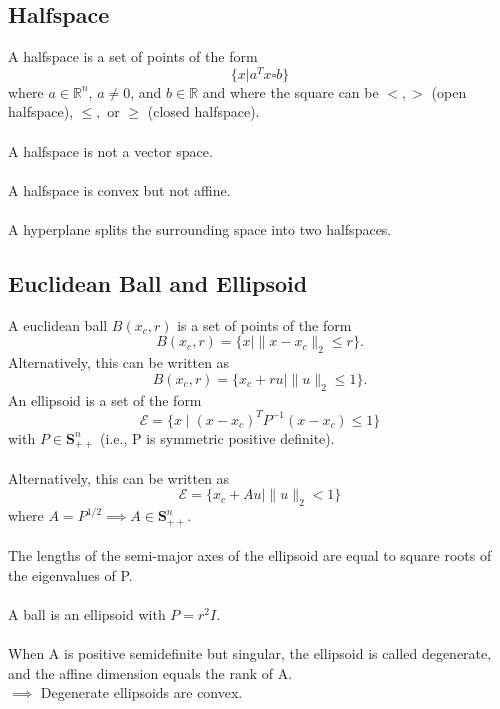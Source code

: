 \documentclass[]{article}
\begin{document}
\subsection*{Halfspace}
A halfspace is a set of points of the form $$\{x|a^{T} x \square b \}$$
where $a \in \mathbb{R}^{n}$, $a \neq 0$, and $b \in \mathbb{R}$ and where the square can be $<, >$ (open halfspace), $\leq,$ or $\geq$ (closed halfspace). \\\\
A halfspace is not a vector space. \\\\
A halfspace is convex but not affine. \\\\
A hyperplane splits the surrounding space into two halfspaces. \\

\subsection*{Euclidean Ball and Ellipsoid}
A euclidean ball $B(x_{c}, r)$ is a set of points of the form $$B(x_{c}, r) = \{x \mid \| x - x_{c} \|_{2} \leq r\}.$$
Alternatively, this can be written as $$B(x_{c}, r) = \{x_{c} + ru \mid \| u \|_{2} \leq 1\}.$$
An ellipsoid is a set of the form $$ \mathcal{E} =  \{ x \mid (x - x_c)^{T} P^{-1} (x - x_{c}) \leq 1 \}$$
with $P \in \boldsymbol{S}^{n}_{++}$ (i.e., P is symmetric positive definite). \\\\
Alternatively, this can be written as $$ \mathcal{E} = \{x_{c} + Au \mid \| u \|_{2} < 1 \}$$
where $A=P^{1/2} \implies A \in \boldsymbol{S}^{n}_{++}.$ \\\\ 
The lengths of the semi-major axes of the ellipsoid are equal to square roots of the eigenvalues of P. \\\\
A ball is an ellipsoid with $P=r^{2}I.$
\\\\
When A is positive semidefinite but singular, the ellipsoid is called degenerate, and the affine dimension equals the rank of A.
\\
$\implies$ Degenerate ellipsoids are convex. \\ 
\end{document}

